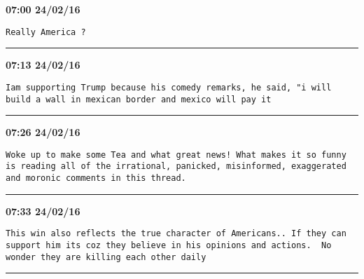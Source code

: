 \begin{adjustwidth}{0cm}{0cm}
\footnotesize \textbf{07:00 24/02/16}

\begin{lstlisting}[breaklines, breakatwhitespace, basicstyle=\small, frame=leftline]
Really America ?
\end{lstlisting}
\end{adjustwidth}

\hrule%

\begin{adjustwidth}{0cm}{0cm}
\footnotesize \textbf{07:13 24/02/16}

\begin{lstlisting}[breaklines, breakatwhitespace, basicstyle=\small, frame=leftline]
Iam supporting Trump because his comedy remarks, he said, "i will build a wall in mexican border and mexico will pay it
\end{lstlisting}
\end{adjustwidth}

\hrule%

\begin{adjustwidth}{0cm}{0cm}
\footnotesize \textbf{07:26 24/02/16}

\begin{lstlisting}[breaklines, breakatwhitespace, basicstyle=\small, frame=leftline]
Woke up to make some Tea and what great news! What makes it so funny is reading all of the irrational, panicked, misinformed, exaggerated and moronic comments in this thread.
\end{lstlisting}
\end{adjustwidth}

\hrule%

\begin{adjustwidth}{0cm}{0cm}
\footnotesize \textbf{07:33 24/02/16}

\begin{lstlisting}[breaklines, breakatwhitespace, basicstyle=\small, frame=leftline]
This win also reflects the true character of Americans.. If they can support him its coz they believe in his opinions and actions.  No wonder they are killing each other daily
\end{lstlisting}
\end{adjustwidth}

\hrule%

